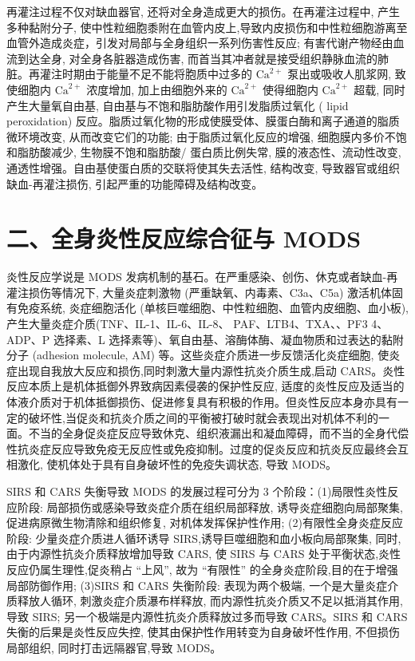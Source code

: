 \documentclass[10pt]{article}
\begin{document}
再灌注过程不仅对缺血器官, 还将对全身造成更大的损伤。在再灌注过程中, 产生多种黏附分子, 使中性粒细胞黍附在血管内皮上,导致内皮损伤和中性粒细胞游离至血管外造成炎症，引发对局部与全身组织一系列伤害性反应; 有害代谢产物经由血流到达全身, 对全身各脏器造成伤害, 而首当其冲者就是接受组织静脉血流的肺脏。再灌注时期由于能量不足不能将胞质中过多的 $\mathrm{Ca}^{2+}$ 泵出或吸收人肌浆网, 致使细胞内 $\mathrm{Ca}^{2+}$ 浓度增加, 加上由细胞外来的 $\mathrm{Ca}^{2+}$ 使得细胞内 $\mathrm{Ca}^{2+}$ 超载, 同时产生大量氧自由基, 自由基与不饱和脂肪酸作用引发脂质过氧化 ( lipid peroxidation) 反应。脂质过氧化物的形成使膜受体、膜蛋白酶和离子通道的脂质微环境改变, 从而改变它们的功能; 由于脂质过氧化反应的增强, 细胞膜内多价不饱和脂肪酸减少, 生物膜不饱和脂肪酸/ 蛋白质比例失常, 膜的液态性、流动性改变, 通透性增强。自由基使蛋白质的交联将使其失去活性, 结构改变, 导致器官或组织缺血-再灌注损伤, 引起严重的功能障碍及结构改变。

\section*{二、全身炎性反应综合征与 MODS}
炎性反应学说是 MODS 发病机制的基石。在严重感染、创伤、休克或者缺血-再灌注损伤等情况下, 大量炎症刺激物 (严重缺氧、内毒素、C3a、C5a) 激活机体固有免疫系统, 炎症细胞活化 (单核巨噬细胞、中性粒细胞、血管内皮细胞、血小板),产生大量炎症介质(TNF、IL-1、IL-6、IL-8、 PAF、LTB4、TXA、、PF3 4、ADP、P 选择素、L 选择素等)、氧自由基、溶酶体酶、凝血物质和过表达的黏附分子 (adhesion molecule, AM) 等。这些炎症介质进一步反馈活化炎症细胞, 使炎症出现自我放大反应和损伤,同时刺激大量内源性抗炎介质生成,启动 CARS。炎性反应本质上是机体抵御外界致病因素侵袭的保护性反应, 适度的炎性反应及适当的体液介质对于机体抵御损伤、促进修复具有积极的作用。但炎性反应本身亦具有一定的破坏性,当促炎和抗炎介质之间的平衡被打破时就会表现出对机体不利的一面。不当的全身促炎症反应导致休克、组织液漏出和凝血障碍，而不当的全身代偿性抗炎症反应导致免疫无反应性或免疫抑制。过度的促炎反应和抗炎反应最终会互相激化, 使机体处于具有自身破坏性的免疫失调状态, 导致 MODS。

SIRS 和 CARS 失衡导致 MODS 的发展过程可分为 3 个阶段：(1)局限性炎性反应阶段: 局部损伤或感染导致炎症介质在组织局部释放, 诱导炎症细胞向局部聚集, 促进病原微生物清除和组织修复, 对机体发挥保护性作用; (2)有限性全身炎症反应阶段: 少量炎症介质进人循环诱导 SIRS,诱导巨噬细胞和血小板向局部聚集, 同时,由于内源性抗炎介质释放增加导致 CARS, 使 SIRS 与 CARS 处于平衡状态,炎性反应仍属生理性,促炎稍占 “上风”, 故为 “有限性” 的全身炎症阶段,目的在于增强局部防御作用; (3)SIRS 和 CARS 失衡阶段: 表现为两个极端, 一个是大量炎症介质释放人循环, 刺激炎症介质瀑布样释放, 而内源性抗炎介质又不足以抵消其作用, 导致 SIRS; 另一个极端是内源性抗炎介质释放过多而导致 CARS。SIRS 和 CARS 失衡的后果是炎性反应失控, 使其由保护性作用转变为自身破坏性作用, 不但损伤局部组织, 同时打击远隔器官,导致 MODS。
\end{document}
